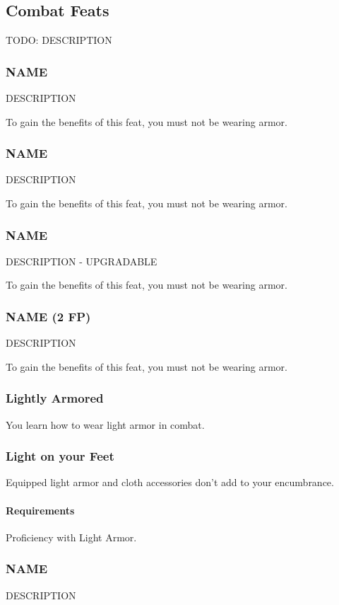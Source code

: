 \subsection*{Combat Feats}
TODO: DESCRIPTION

\subsubsection{NAME} \label{feat::name}
    DESCRIPTION

    To gain the benefits of this feat, you must not be wearing armor.
\subsubsection{NAME} \label{feat::name}
    DESCRIPTION

    To gain the benefits of this feat, you must not be wearing armor.
\subsubsection{NAME} \label{feat::name}
    DESCRIPTION - UPGRADABLE

    To gain the benefits of this feat, you must not be wearing armor.
\subsubsection{NAME (2 FP)} \label{feat::name}
    DESCRIPTION

    To gain the benefits of this feat, you must not be wearing armor.
\subsubsection{Lightly Armored} \label{feat::lightlyarmored}
    You learn how to wear light armor in combat.
\subsubsection{Light on your Feet} \label{feat::lightonyourfeet}
    Equipped light armor and cloth accessories don't add to your encumbrance.
    \paragraph{Requirements} Proficiency with Light Armor.
\subsubsection{NAME} \label{feat::name}
    DESCRIPTION

